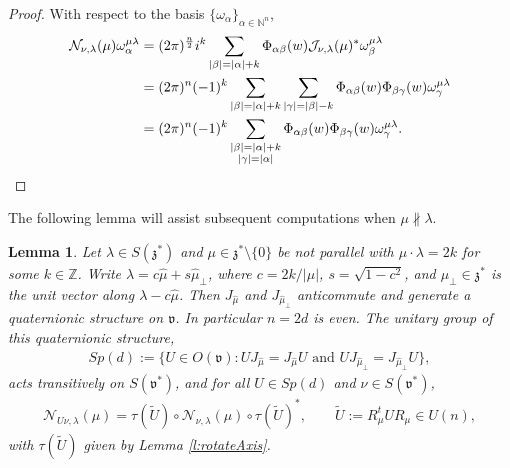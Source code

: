 \documentclass[11pt]{amsart}
\theoremstyle{plain}
\newtheorem{lemma}[theorem]{Lemma}
\theoremstyle{definition}
\theoremstyle{remark}
\numberwithin{equation}{section}
\def\fz{\mathfrak{z}}
\def\fv{\mathfrak{v}}
\def\cN{\mathcal{N}}
\def\cJ{\mathcal{J}}
\def\mz{\setminus\{0\}}
\def\N{{\mathbb N}}%
\def\Z{{\mathbb Z}}%
\numberwithin{equation}{section}
\begin{document}
\begin{proof}
	With respect to the basis $\{\omega_\alpha\}_{\alpha\in \N^n}$,
	\begin{align*}
		\cN_{\nu, \lambda}(\mu)\omega_\alpha^{\mu\lambda}
		&=(2\pi)^{\frac{n}{2}}i^k\sum_{|\beta|=|\alpha|+k}\Phi_{\alpha\beta}(w)\cJ_{\nu, \lambda}(\mu)^*\omega_\beta^{\mu\lambda}\\
		&=(2\pi)^n(-1)^k\sum_{|\beta|=|\alpha|+k}\sum_{|\gamma|=|\beta|-k}\Phi_{\alpha\beta}(w)\Phi_{\beta\gamma}(w)\omega_\gamma^{\mu\lambda}\\
		&=(2\pi)^n(-1)^k\sum_{\substack{|\beta|=|\alpha|+k \\ |\gamma|=|\alpha|}}\Phi_{\alpha\beta}(w)\Phi_{\beta\gamma}(w)\omega_\gamma^{\mu\lambda}.\qedhere
	\end{align*}
\end{proof}
The following lemma will assist subsequent computations when $\mu \not\parallel\lambda$.
\begin{lemma}\label{l:sU}
	Let $\lambda\in S(\fz^*)$ and $\mu\in \fz^*\mz$ be not parallel with $\mu\cdot\lambda=2k$ for some $k\in \Z$. Write $\lambda=c\hat\mu+s{\hat\mu}_\perp$, where $c=2k/|\mu|$, $s=\sqrt{1-c^2}$, and ${\hat\mu}_\perp\in \fz^*$ is the unit vector along $\lambda-c\hat\mu$. Then $J_{\hat\mu}$ and $J_{{\hat\mu}_\perp}$ anticommute and generate a quaternionic structure on $\fv$. In particular $n=2d$ is even. The unitary group of this quaternionic structure,
	\begin{align*}
		Sp(d):=\{U\in O(\fv): UJ_{\hat\mu}=J_{\hat\mu}U \text{ and } UJ_{{\hat\mu}_\perp}=J_{{\hat\mu}_\perp}U\},
	\end{align*}
	acts transitively on $S(\fv^*)$, and for all $U\in Sp(d)$ and $\nu\in S(\fv^*)$,
	\begin{align}\label{e:sU}
		\cN_{U\nu, \lambda}(\mu)=\tau(\widetilde U)\circ\cN_{\nu, \lambda}(\mu)\circ\tau(\widetilde U)^*, \qquad \widetilde U:=R_\mu^tUR_\mu\in U(n),
	\end{align}
	with $\tau(\widetilde U)$ given by Lemma \ref{l:rotateAxis}.
\end{lemma}
\end{document}
